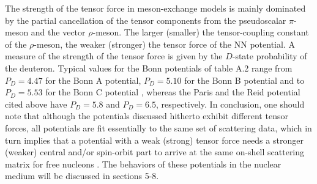The strength of the tensor force in meson-exchange models
is mainly dominated by the partial cancellation of the tensor components
from the pseudoscalar $\pi$-meson and the vector $\rho$-meson. The larger
(smaller) the tensor-coupling constant of the $\rho$-meson, the weaker
(stronger) the tensor force of the NN potential.
A measure of the strength of the tensor force is given by
the $D$-state probability
of the deuteron. Typical values for the Bonn potentials of table A.2 range from
$P_{D}=4.47$ for the Bonn A potential, $P_{D}=5.10$ for the Bonn B potential and
to $P_{D}=5.53$ for the Bonn C potential \cite{mac89}, whereas the
Paris and the Reid potential cited above have $P_{D}=5.8$ and
$P_{D}=6.5$, respectively. 
In conclusion, one should note that although
the potentials discussed hitherto exhibit different tensor forces,
all potentials are fit essentially to the same set of scattering data,
which in turn implies that a potential with a weak (strong) tensor force
needs a stronger (weaker) central and/or spin-orbit part to arrive at
the same on-shell scattering matrix for free nucleons \cite{mac89}.
The behaviors of these potentials in the nuclear medium will be discussed
in sections 5-8.

